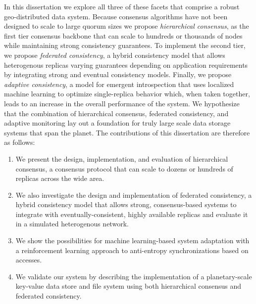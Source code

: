 In this dissertation we explore all three of these facets that comprise a robust geo-distributed data system.
Because consensus algorithms have not been designed to scale to large quorum sizes we propose \emph{hierarchical consensus}, as the first tier consensus backbone that can scale to hundreds or thousands of nodes while maintaining strong consistency guarantees.
To implement the second tier, we propose \emph{federated consistency}, a hybrid consistency model that allows heterogenous replicas varying guarantees depending on application requirements by integrating strong and eventual consistency models.
Finally, we propose \emph{adaptive consistency}, a model for emergent introspection that uses localized machine learning to optimize single-replica behavior which, when taken together, leads to an increase in the overall performance of the system.
We hypothesize that the combination of hierarchical consensus, federated consistency, and adaptive monitoring lay out a foundation for truly large scale data storage systems that span the planet.
The contributions of this dissertation are therefore as follows:

\begin{enumerate}
    \item We present the design, implementation, and evaluation of hierarchical consensus, a consensus protocol that can scale to dozens or hundreds of replicas across the wide area.
    \item We also investigate the design and implementation of federated consistency, a hybrid consistency model that allows strong, consensus-based systems to integrate with eventually-consistent, highly available replicas and evaluate it in a simulated heterogenous network.
    \item We show the possibilities for machine learning-based system adaptation with a reinforcement learning approach to anti-entropy synchronizations based on accesses.
    \item We validate our system by describing the implementation of a planetary-scale key-value data store and file system using both hierarchical consensus and federated consistency.
\end{enumerate}



